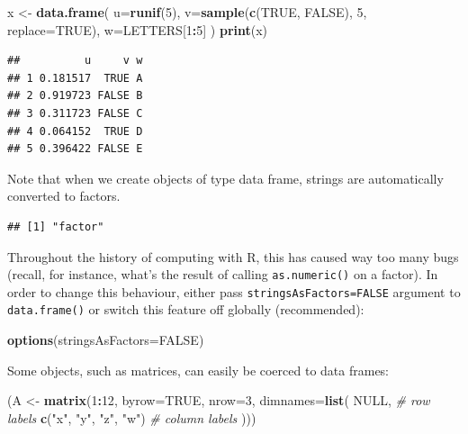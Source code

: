 \documentclass[10pt,b5paper,krantz1]{krantz}
\newenvironment{Shaded}{\begin{snugshade}}{\end{snugshade}}
\newcommand{\CommentTok}[1]{\textcolor[rgb]{0.37,0.37,0.37}{\textit{#1}}}
\newcommand{\DataTypeTok}[1]{\textcolor[rgb]{0.27,0.27,0.27}{#1}}
\newcommand{\DecValTok}[1]{\textcolor[rgb]{0.06,0.06,0.06}{#1}}
\newcommand{\KeywordTok}[1]{\textcolor[rgb]{0.27,0.27,0.27}{\textbf{#1}}}
\newcommand{\NormalTok}[1]{#1}
\newcommand{\OperatorTok}[1]{\textcolor[rgb]{0.43,0.43,0.43}{\textbf{#1}}}
\newcommand{\OtherTok}[1]{\textcolor[rgb]{0.37,0.37,0.37}{#1}}
\newcommand{\StringTok}[1]{\textcolor[rgb]{0.5,0.5,0.5}{#1}}
\begin{document}
\begin{Shaded}
\begin{Highlighting}[]
\NormalTok{x <-}\StringTok{ }\KeywordTok{data.frame}\NormalTok{(}
    \DataTypeTok{u=}\KeywordTok{runif}\NormalTok{(}\DecValTok{5}\NormalTok{),}
    \DataTypeTok{v=}\KeywordTok{sample}\NormalTok{(}\KeywordTok{c}\NormalTok{(}\OtherTok{TRUE}\NormalTok{, }\OtherTok{FALSE}\NormalTok{), }\DecValTok{5}\NormalTok{, }\DataTypeTok{replace=}\OtherTok{TRUE}\NormalTok{),}
    \DataTypeTok{w=}\NormalTok{LETTERS[}\DecValTok{1}\OperatorTok{:}\DecValTok{5}\NormalTok{]}
\NormalTok{)}
\KeywordTok{print}\NormalTok{(x)}
\end{Highlighting}
\end{Shaded}

\begin{verbatim}
##          u     v w
## 1 0.181517  TRUE A
## 2 0.919723 FALSE B
## 3 0.311723 FALSE C
## 4 0.064152  TRUE D
## 5 0.396422 FALSE E
\end{verbatim}

Note that when we create objects of type data frame,
strings are automatically converted to factors.

\begin{Shaded}
\end{Shaded}

\begin{verbatim}
## [1] "factor"
\end{verbatim}

Throughout the history of computing with R, this has caused way too many bugs
(recall, for instance, what's the result of calling \texttt{as.numeric()} on a factor).
In order to change this behaviour, either pass \texttt{stringsAsFactors=FALSE}
argument to \texttt{data.frame()} or switch this feature off globally (recommended):

\begin{Shaded}
\begin{Highlighting}[]
\KeywordTok{options}\NormalTok{(}\DataTypeTok{stringsAsFactors=}\OtherTok{FALSE}\NormalTok{)}
\end{Highlighting}
\end{Shaded}

Some objects, such as matrices, can easily be coerced to data frames:

\begin{Shaded}
\begin{Highlighting}[]
\NormalTok{(A <-}\StringTok{ }\KeywordTok{matrix}\NormalTok{(}\DecValTok{1}\OperatorTok{:}\DecValTok{12}\NormalTok{, }\DataTypeTok{byrow=}\OtherTok{TRUE}\NormalTok{, }\DataTypeTok{nrow=}\DecValTok{3}\NormalTok{,}
    \DataTypeTok{dimnames=}\KeywordTok{list}\NormalTok{(}
        \OtherTok{NULL}\NormalTok{,     }\CommentTok{# row labels}
        \KeywordTok{c}\NormalTok{(}\StringTok{"x"}\NormalTok{, }\StringTok{"y"}\NormalTok{, }\StringTok{"z"}\NormalTok{, }\StringTok{"w"}\NormalTok{) }\CommentTok{# column labels}
\NormalTok{)))}
\end{Highlighting}
\end{Shaded}
\end{document}
